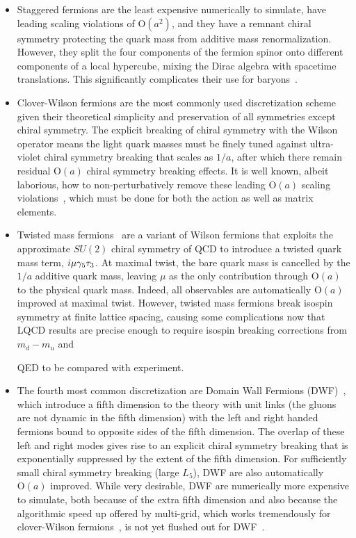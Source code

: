 \begin{itemize}[leftmargin=*]
\item Staggered fermions are the least expensive numerically to simulate, have leading scaling violations of $\mathrm{O}(a^2)$, and they have a remnant chiral symmetry protecting the quark mass from additive mass renormalization.  However, they split the four components of the fermion spinor onto different components of a local hypercube, mixing the Dirac algebra with spacetime translations.  This significantly complicates their use for baryons~\addcite{}.

\item Clover-Wilson fermions are the most commonly used discretization scheme given their theoretical simplicity and preservation of all symmetries except chiral symmetry.  The explicit breaking of chiral symmetry with the Wilson operator means the light quark masses must be finely tuned against ultra-violet chiral symmetry breaking that scales as $1/a$, after which there remain residual $\mathrm{O}(a)$ chiral symmetry breaking effects.  It is well known, albeit laborious, how to non-perturbatively remove these leading $\mathrm{O}(a)$ scaling violations~\addcite{}, which must be done for both the action as well as matrix elements.

\item Twisted mass fermions~\addcite{} are a variant of Wilson fermions that exploits the approximate $SU(2)$ chiral symmetry of QCD to introduce a twisted quark mass term, $i\mu\gamma_5 \tau_3$.  At maximal twist, the bare quark mass is cancelled by the $1/a$ additive quark mass, leaving $\mu$ as the only contribution through $\mathrm{O}(a)$ to the physical quark mass.  Indeed, all observables are automatically $\mathrm{O}(a)$ improved at maximal twist.
However, twisted mass fermions break isospin symmetry at finite lattice spacing, causing some complications now that LQCD results are precise enough to require isospin breaking corrections from $m_d-m_u$ and
\begin{marginnote}
\end{marginnote}%
QED to be compared with experiment.

\item The fourth most common discretization are Domain Wall Fermions (DWF)~\addcite{}, which introduce a fifth dimension to the theory with unit links (the gluons are not dynamic in the fifth dimension) with the left and right handed fermions bound to opposite sides of the fifth dimension.  The overlap of these left and right modes gives rise to an explicit chiral symmetry breaking that is exponentially suppressed by the extent of the fifth dimension.  For sufficiently small chiral symmetry breaking (large $L_5$), DWF are also automatically $\mathrm{O}(a)$ improved.
While very desirable, DWF are numerically more expensive to simulate, both because of the extra fifth dimension and also because the algorithmic speed up offered by multi-grid, which works tremendously for clover-Wilson fermions~, is not yet flushed out for DWF~.


\end{itemize}
